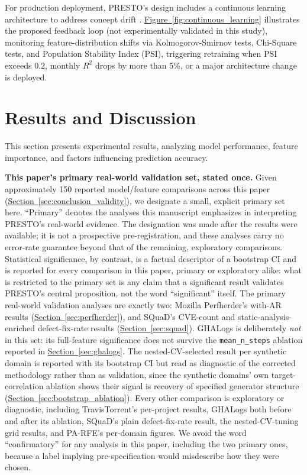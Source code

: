 \documentclass[technologies,article,submit,pdftex,moreauthors]{Definitions/mdpi}
\begin{document}
For production deployment, PRESTO's design includes a continuous learning architecture to address concept drift \citep{gama2014}. \hyperref[fig:continuous_learning]{Figure~\ref*{fig:continuous_learning}} illustrates the proposed feedback loop (not experimentally validated in this study), monitoring feature-distribution shifts via Kolmogorov-Smirnov tests, Chi-Square tests, and Population Stability Index (PSI), triggering retraining when PSI exceeds 0.2, monthly \(R^2\) drops by more than 5\%, or a major architecture change is deployed.

\section{Results and Discussion}\label{sec:results}

This section presents experimental results, analyzing model performance, feature importance, and factors influencing prediction accuracy.

\textbf{This paper's primary real-world validation set, stated once.} Given approximately 150 reported model/feature comparisons across this paper (\hyperref[sec:conclusion_validity]{Section~\ref*{sec:conclusion_validity}}), we designate a small, explicit primary set here. ``Primary'' denotes the analyses this manuscript emphasizes in interpreting PRESTO's real-world evidence. The designation was made after the results were available; it is not a prospective pre-registration, and these analyses carry no error-rate guarantee beyond that of the remaining, exploratory comparisons. Statistical significance, by contrast, is a factual descriptor of a bootstrap CI and is reported for every comparison in this paper, primary or exploratory alike: what is restricted to the primary set is any claim that a significant result validates PRESTO's central proposition, not the word ``significant'' itself. The primary real-world validation analyses are exactly two: Mozilla Perfherder's with-AR results (\hyperref[sec:perfherder]{Section~\ref*{sec:perfherder}}), and SQuaD's CVE-count and static-analysis-enriched defect-fix-rate results (\hyperref[sec:squad]{Section~\ref*{sec:squad}}). GHALogs is deliberately \emph{not} in this set: its full-feature significance does not survive the \texttt{mean\_n\_steps} ablation reported in \hyperref[sec:ghalogs]{Section~\ref*{sec:ghalogs}}. The nested-CV-selected result per synthetic domain is reported with its bootstrap CI but read as diagnostic of the corrected methodology rather than as validation, since the synthetic domains' own target-correlation ablation shows their signal is recovery of specified generator structure (\hyperref[sec:bootstrap_ablation]{Section~\ref*{sec:bootstrap_ablation}}). Every other comparison is exploratory or diagnostic, including TravisTorrent's per-project results, GHALogs both before and after its ablation, SQuaD's plain defect-fix-rate result, the nested-CV-tuning grid results, and PA-RFE's per-domain figures. We avoid the word ``confirmatory'' for any analysis in this paper, including the two primary ones, because a label implying pre-specification would misdescribe how they were chosen.
\end{document}
